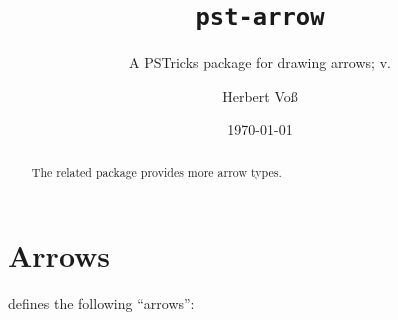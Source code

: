 \documentclass[11pt,english,BCOR10mm,DIV=14,bibliography=totoc,parskip=false,smallheadings,
    headexclude,footexclude,twoside]{pst-doc}
\let\pstArrowFV\fileversion
\begin{document}
\title{\texttt{pst-arrow}}
\subtitle{A PSTricks package for drawing arrows; v.\pstArrowFV}
\author{Herbert Voß}
\date{\today}

\settitle

\tableofcontents

\begin{abstract}
\noindent
The  related package provides more arrow types.

\end{abstract}

\section{Arrows}
 defines the following "`arrows"':
\end{document}
